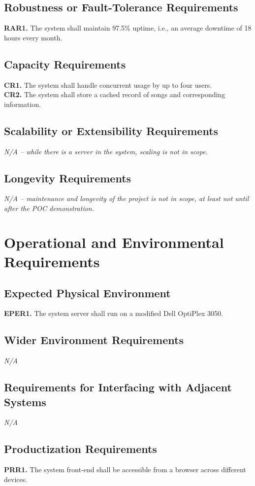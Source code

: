 \documentclass[12pt]{article}
\begin{document}
\subsection{Robustness or Fault-Tolerance Requirements}
\textbf{RAR1.} The system shall maintain 97.5\% uptime, i.e., an average downtime of 18 hours every month.
\subsection{Capacity Requirements}
\textbf{CR1.} The system shall handle concurrent usage by up to four users. \\
\textbf{CR2.} The system shall store a cached record of songs and corresponding information.
\subsection{Scalability or Extensibility Requirements}
\emph{N/A -- while there is a server in the system, scaling is not in scope.}
\subsection{Longevity Requirements}
\emph{N/A -- maintenance and longevity of the project is not in scope, at least not until after the POC demonstration.}
\section{Operational and Environmental Requirements}
\subsection{Expected Physical Environment}
\textbf{EPER1.} The system server shall run on a modified Dell OptiPlex 3050. \\
\subsection{Wider Environment Requirements}
\emph{N/A}
\subsection{Requirements for Interfacing with Adjacent Systems}
\emph{N/A}
\subsection{Productization Requirements}
\textbf{PRR1.} The system front-end shall be accessible from a browser across different devices.
\end{document}
